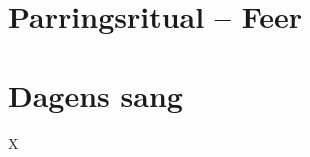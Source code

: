 \begin{minipage}[t]{100mm}
\vspace{3mm}

\section*{Parringsritual -- Feer}


\section*{Dagens sang}
\begin{center}
X
\end{center}
\end{minipage}
